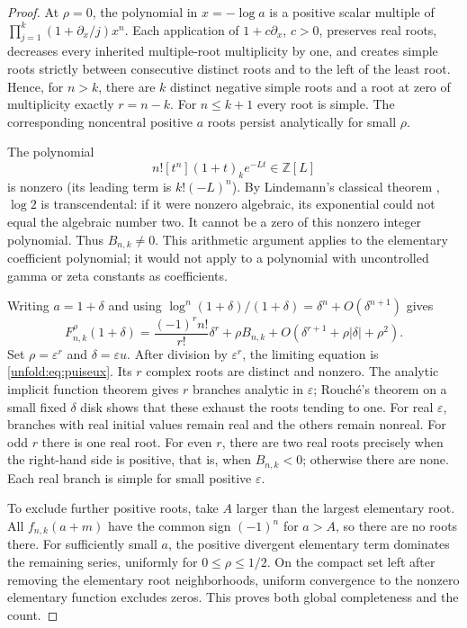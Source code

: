 \begin{proof}
At $\rho=0$, the polynomial in $x=-\log a$ is a positive scalar
multiple of
$\prod_{j=1}^k(1+\partial_x/j)x^n$. Each application of
$1+c\partial_x$, $c>0$, preserves real roots, decreases every
inherited multiple-root multiplicity by one, and creates simple
roots strictly between consecutive distinct roots and to the left
of the least root. Hence, for $n>k$, there are $k$ distinct
negative simple roots and a root at zero of multiplicity exactly
$r=n-k$. For $n\leq k+1$ every root is simple. The corresponding
noncentral positive $a$ roots persist analytically for small $\rho$.

The polynomial
\[
 n![t^n](1+t)_k e^{-Lt}\in\mathbb Z[L]
\]
is nonzero (its leading term is $k!(-L)^n$). By Lindemann's
classical theorem \cite{Lindemann}, $\log2$ is transcendental: if it were nonzero
algebraic, its exponential could not equal the algebraic number two.
It cannot be a zero of this nonzero integer polynomial. Thus
$B_{n,k}\ne0$. This arithmetic argument applies to the elementary
coefficient polynomial; it would not apply to a polynomial with
uncontrolled gamma or zeta constants as coefficients.

Writing $a=1+\delta$ and using
$\log^n(1+\delta)/(1+\delta)=\delta^n+O(\delta^{n+1})$ gives
\[
 F_{n,k}^{\rho}(1+\delta)
 =\frac{(-1)^r n!}{r!}\delta^r+\rho B_{n,k}
    +O(\delta^{r+1}+\rho|\delta|+\rho^2).
\]
Set $\rho=\varepsilon^r$ and $\delta=\varepsilon u$.
After division by $\varepsilon^r$, the limiting equation is
\eqref{unfold:eq:puiseux}. Its $r$ complex roots are distinct and
nonzero. The analytic implicit function theorem gives $r$ branches
analytic in $\varepsilon$; Rouch\'e's theorem on a small fixed
$\delta$ disk shows that these exhaust the roots tending to one.
For real $\varepsilon$, branches with real initial values remain
real and the others remain nonreal. For odd $r$ there is one real
root. For even $r$, there are two real roots precisely when the
right-hand side is positive, that is, when $B_{n,k}<0$; otherwise
there are none. Each real branch is simple for small positive
$\varepsilon$.

To exclude further positive roots, take $A$ larger than the largest
elementary root. All $f_{n,k}(a+m)$ have the common sign $(-1)^n$
for $a>A$, so there are no roots there. For sufficiently small $a$,
the positive divergent elementary term dominates the remaining
series, uniformly for $0\leq\rho\leq1/2$. On the compact set
left after removing the elementary root neighborhoods, uniform
convergence to the nonzero elementary function excludes zeros.
This proves both global completeness and the count.
\end{proof}

